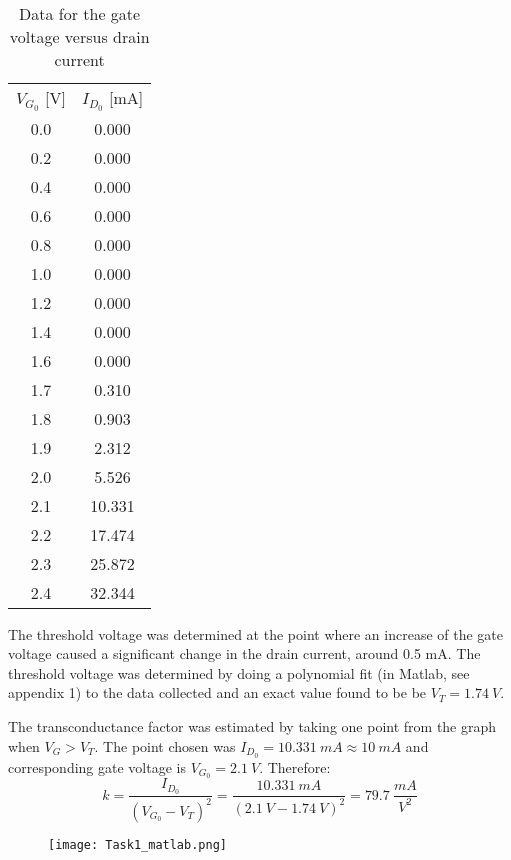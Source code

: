   \begin{table}[htbp]
     \centering
     \caption{Data for the gate voltage versus drain current}
       \begin{tabular}{cc}
       $V_{G_0}$ [V]       & $I_{D_0}$ [mA] \\
       0.0          & 0.000 \\
       0.2          & 0.000 \\
       0.4          & 0.000 \\
       0.6          & 0.000 \\
       0.8          & 0.000 \\
       1.0          & 0.000 \\
       1.2          & 0.000 \\
       1.4          & 0.000 \\
       1.6          & 0.000 \\
       1.7          & 0.310 \\
       1.8          & 0.903 \\
       1.9          & 2.312 \\
       2.0          & 5.526 \\
       2.1          & 10.331 \\
       2.2          & 17.474 \\
       2.3          & 25.872 \\
       2.4          & 32.344 \\

       \end{tabular}%
     \label{tab:addlabel}%
   \end{table}%
The threshold voltage was determined at the point where an increase of the gate voltage caused a significant change in the drain current, around 0.5 mA. The threshold voltage was determined by doing a polynomial fit (in Matlab, see appendix 1) to the data collected and an exact value found to be be $V_T = 1.74 \ V$.


The transconductance factor was estimated by taking one point from the graph when $V_G > V_T$. The point chosen was $I_{D_0}  = 10.331 \ mA  \approx 10 \ mA$ and corresponding gate voltage is $V_{G_0} = 2.1 \ V$. Therefore: $$ k = \dfrac{I_{D_0}}{(V_{G_0}-V_T)^2} = \dfrac{10.331 \ mA}{(2.1 \ V - 1.74 \ V)^2} = 79.7 \ \dfrac{mA}{V^2} $$

\begin{figure}[h!]
        \centering
        \texttt{[image: Task1\_matlab.png]}
\end{figure}


\pagebreak